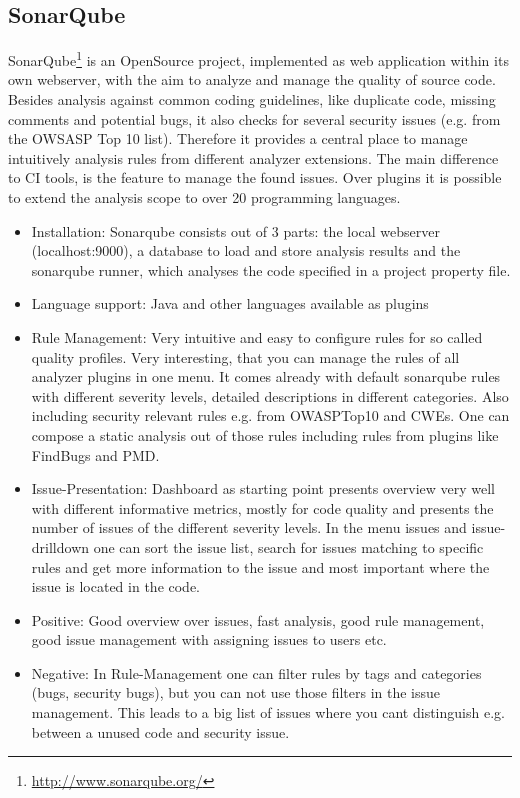 \documentclass[conference]{IEEEtran}
\begin{document}
\subsection{SonarQube}
\label{subsec:sonarqube}
SonarQube\footnote{\href{http://www.sonarqube.org/}{http://www.sonarqube.org/}} is an OpenSource project, implemented as web application within its own webserver, with the aim to analyze and manage the quality of source code. 
Besides analysis against common coding guidelines, like duplicate code, missing comments and potential bugs, it also checks for several security issues (e.g. from the OWSASP Top 10 list).
Therefore it provides a central place to manage intuitively analysis rules from different analyzer extensions.
The main difference to CI tools, is the feature to manage the found issues.
Over plugins it is possible to extend the analysis scope to over 20 programming languages.


\begin{itemize}
\item Installation: Sonarqube consists out of 3 parts: the local webserver (localhost:9000), a database to load and store analysis results and the sonarqube runner, which analyses the code specified in a project property file.

\item Language support: Java and other languages available as plugins

\item Rule Management: Very intuitive and easy to configure rules for so called quality profiles. Very interesting, that you can manage the rules of all analyzer plugins in one menu. It comes already with default sonarqube rules with different severity levels, detailed descriptions in different categories. Also including security relevant rules e.g. from OWASPTop10 and CWEs. One can compose a static analysis out of those rules including rules from plugins like FindBugs and PMD.

\item Issue-Presentation: Dashboard as starting point presents overview very well with different informative metrics, mostly for code quality and presents the number of issues of the different severity levels.
In the menu issues and issue-drilldown one can sort the issue list, search for issues matching to specific rules and get more information to the issue and most important where the issue is located in the code.

\item Positive: Good overview over issues, fast analysis, good rule management, good issue management with assigning issues to users etc.

\item Negative: In Rule-Management one can filter rules by tags and categories (bugs, security bugs), but you can not use those filters in the issue management. This leads to a big list of issues where you cant distinguish e.g. between a unused code and security issue.
 
\end{itemize}
\end{document}
